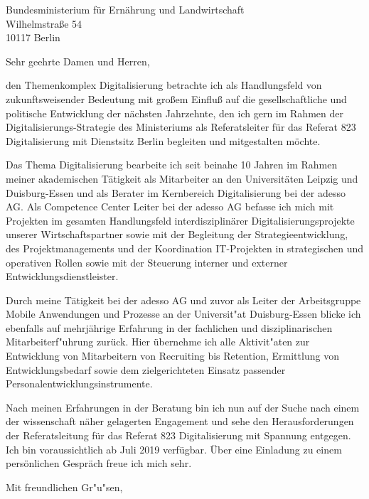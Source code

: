 \documentclass[10pt,a4paper]{dinbrief}
\date{\today}
\begin{document}
 
\begin{letter}  
{%
	Bundesministerium für Ernährung und Landwirtschaft\\
	Wilhelmstraße 54\\
	10117 Berlin
}
\subject{\bf Bewerbung Referatsleitung für das Referat 823 Digitalisierung / Kennziffer 1905}
\opening{Sehr geehrte Damen und Herren,}
den Themenkomplex Digitalisierung betrachte ich als Handlungsfeld von zukunftsweisender Bedeutung mit großem Einfluß auf die gesellschaftliche und politische Entwicklung der nächsten Jahrzehnte, den ich gern im Rahmen der Digitalisierungs-Strategie des Ministeriums als Referatsleiter für das Referat 823 Digitalisierung mit Dienstsitz Berlin begleiten und mitgestalten möchte.

Das Thema Digitalisierung bearbeite ich seit beinahe 10 Jahren im Rahmen meiner akademischen Tätigkeit als Mitarbeiter an den Universitäten Leipzig und Duisburg-Essen und als Berater im Kernbereich Digitalisierung bei der adesso AG. Als Competence Center Leiter bei der adesso AG befasse ich mich mit Projekten im gesamten Handlungsfeld interdisziplinärer  Digitalisierungsprojekte unserer Wirtschaftspartner sowie mit der Begleitung der Strategieentwicklung, des Projektmanagements und der Koordination IT-Projekten in strategischen und operativen Rollen sowie mit der Steuerung interner und externer Entwicklungsdienstleister.

Durch meine Tätigkeit bei der adesso AG und zuvor als Leiter der Arbeitsgruppe Mobile Anwendungen und Prozesse an der Universit"at Duisburg-Essen blicke ich ebenfalls auf mehrjährige Erfahrung in der fachlichen und disziplinarischen Mitarbeiterf"uhrung zurück. Hier übernehme ich alle Aktivit"aten zur Entwicklung von Mitarbeitern von Recruiting bis Retention, Ermittlung von Entwicklungsbedarf sowie dem zielgerichteten Einsatz passender Personalentwicklungsinstrumente.

Nach meinen Erfahrungen in der Beratung bin ich nun auf der Suche nach einem der wissenschaft näher gelagerten Engagement und sehe den Herausforderungen der Referatsleitung für das Referat 823 Digitalisierung mit Spannung entgegen. Ich bin voraussichtlich ab Juli 2019 verfügbar. Über eine Einladung zu einem persönlichen Gespräch freue ich mich sehr.
\closing{Mit freundlichen Gr"u"sen,}
\end{letter}
\end{document}
